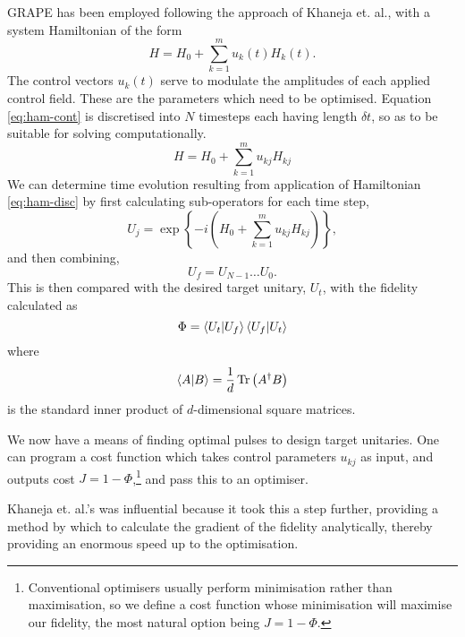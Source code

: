 \documentclass[../Thesis.tex]{subfiles}
\begin{document}
GRAPE has been employed following the approach of Khaneja et. al., with a system Hamiltonian of the form
\begin{equation}
    H = H_0 + \sum_{k=1}^m u_k(t)H_k(t).
    \label{eq:ham-cont}
\end{equation}
The control vectors $u_k(t)$ serve to modulate the amplitudes of each applied control field. These are the parameters which need to be optimised. Equation \ref{eq:ham-cont} is discretised into $N$ timesteps each having length $\delta t$, so as to be suitable for solving computationally. 
\begin{equation}
    H = H_0 + \sum_{k=1}^m u_{kj}H_{kj}
    \label{eq:ham-disc}
\end{equation}
We can determine time evolution resulting from application of Hamiltonian \ref{eq:ham-disc} by first calculating sub-operators for each time step,
\begin{equation}
    U_j = \exp\left\{-i\left(H_0 + \sum_{k=1}^m u_{kj}H_{kj}\right)\right\},
\end{equation}
and then combining,
\begin{equation}
    U_f = U_{N-1}\dots U_0.
\end{equation}
This is then compared with the desired target unitary, $U_t$, with the fidelity calculated as
\begin{equation}
    \Phi = \bra{U_t}\ket{U_f}\bra{U_f}\ket{U_t}
\end{equation}
where 
\begin{equation}
    \bra{A}\ket{B} = \frac{1}{d}\Tr\left(A^\dagger B\right)
\end{equation}
is the standard inner product of $d$-dimensional square matrices.

We now have a means of finding optimal pulses to design target unitaries. One can program a cost function which takes control parameters $u_{kj}$ as input, and outputs cost $J=1-\Phi$,\footnote{Conventional optimisers usually perform minimisation rather than maximisation, so we define a cost function whose minimisation will maximise our fidelity, the most natural option being $J=1-\Phi$.} and pass this to an optimiser. 

Khaneja et. al.'s was influential because it took this a step further, providing a method by which to calculate the gradient of the fidelity analytically, thereby providing an enormous speed up to the optimisation.
\end{document}
